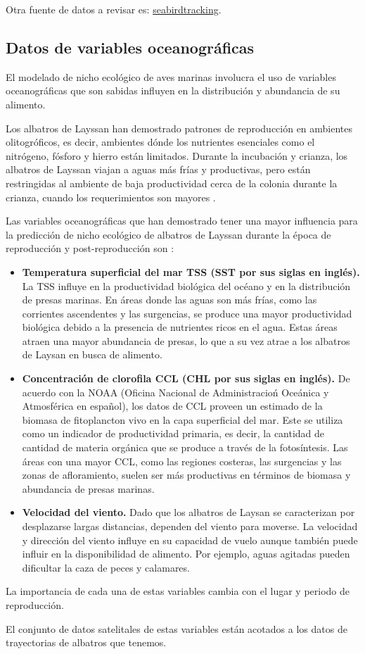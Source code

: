 Otra fuente de datos a revisar es:
\href{https://data.seabirdtracking.org/dataset/1928}{seabirdtracking}.

\subsection*{Datos de variables oceanográficas}

El modelado de nicho ecológico de aves marinas involucra el uso de variables
oceanográficas que son sabidas influyen en la distribución y abundancia de su
alimento. 

Los albatros de Layssan han demostrado patrones de reproducción en ambientes
olitogróficos, es decir, ambientes dónde los nutrientes esenciales como el
nitrógeno, fósforo y hierro están limitados. Durante la incubación y crianza,
los albatros de Layssan viajan a aguas más frías y productivas, pero están
restringidas al ambiente de baja productividad cerca de la colonia durante la
crianza, cuando los requerimientos son mayores \cite{kappes2015reproductive}.

Las variables oceanográficas que han demostrado tener una mayor influencia para
la predicción de nicho ecológico de albatros de Layssan durante la época de
reproducción y post-reproducción son \cite{henry2021successful}:

\begin{itemize}
    \item \textbf{Temperatura superficial del mar TSS (SST por sus siglas en
    inglés).} La TSS influye en la productividad biológica del océano y en la
    distribución de presas marinas. En áreas donde las aguas son más frías, como
    las corrientes ascendentes y las surgencias, se produce una mayor
    productividad biológica debido a la presencia de nutrientes ricos en el
    agua. Estas áreas atraen una mayor abundancia de presas, lo que a su vez
    atrae a los albatros de Laysan en busca de alimento.

    \item \textbf{Concentración de clorofila CCL (CHL por sus siglas en
    inglés).} De acuerdo con la NOAA (Oficina Nacional de Administracioń
    Oceánica y Atmosférica en español), los datos de CCL proveen un estimado de
    la biomasa de fitoplancton vivo en la capa superficial del mar. Este se
    utiliza como un indicador de productividad primaria, es decir, la cantidad
    de cantidad de materia orgánica que se produce a través de la fotosíntesis.
    Las áreas con una mayor CCL, como las regiones costeras, las surgencias y
    las zonas de afloramiento, suelen ser más productivas en términos de biomasa
    y abundancia de presas marinas.

    \item \textbf{Velocidad del viento.} Dado que los albatros de Laysan se
    caracterizan por desplazarse largas distancias, dependen del viento para
    moverse. La velocidad y dirección del viento influye en su capacidad de
    vuelo aunque también puede influir en la disponibilidad de alimento. Por
    ejemplo, aguas agitadas pueden dificultar la caza de peces y calamares.

\end{itemize}

La importancia de cada una de estas variables cambia con el lugar y periodo de
reproducción.

El conjunto de datos satelitales de estas variables están acotados a los datos
de trayectorias de albatros que tenemos.
